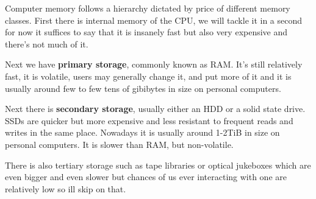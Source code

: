 \documentclass[../ops.tex]{subfiles}
\begin{document}
        Computer memory follows a hierarchy dictated by price of different
        memory classes. First there is internal memory of the CPU, we will
        tackle it in a second for now it suffices to say that it is insanely
        fast but also very expensive and there's not much of it.

        Next we have {\bf primary storage}, commonly known as RAM. It's still
        relatively fast, it is volatile, users may generally change it, and put
        more of it and it is usually around few to few tens of gibibytes in
        size on personal computers.

        Next there is {\bf secondary storage}, usually either an HDD or a solid
        state drive. SSDs are quicker but more expensive and less resistant to
        frequent reads and writes in the same place. Nowadays it is usually
        around 1-2TiB in size on personal computers. It is slower than RAM, but
        non-volatile.

        There is also tertiary storage such as tape libraries or optical
        jukeboxes which are even bigger and even slower but chances of us ever
        interacting with one are relatively low so ill skip on that.
\end{document}
